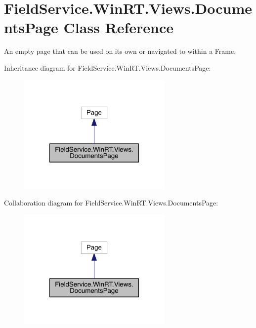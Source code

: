 \hypertarget{class_field_service_1_1_win_r_t_1_1_views_1_1_documents_page}{\section{Field\+Service.\+Win\+R\+T.\+Views.\+Documents\+Page Class Reference}
\label{class_field_service_1_1_win_r_t_1_1_views_1_1_documents_page}
}


An empty page that can be used on its own or navigated to within a Frame.  




Inheritance diagram for Field\+Service.\+Win\+R\+T.\+Views.\+Documents\+Page\+:
\nopagebreak
\begin{figure}[H]
\begin{center}
\leavevmode
\includegraphics[width=214pt]{class_field_service_1_1_win_r_t_1_1_views_1_1_documents_page__inherit__graph}
\end{center}
\end{figure}


Collaboration diagram for Field\+Service.\+Win\+R\+T.\+Views.\+Documents\+Page\+:
\nopagebreak
\begin{figure}[H]
\begin{center}
\leavevmode
\includegraphics[width=214pt]{class_field_service_1_1_win_r_t_1_1_views_1_1_documents_page__coll__graph}
\end{center}
\end{figure}
